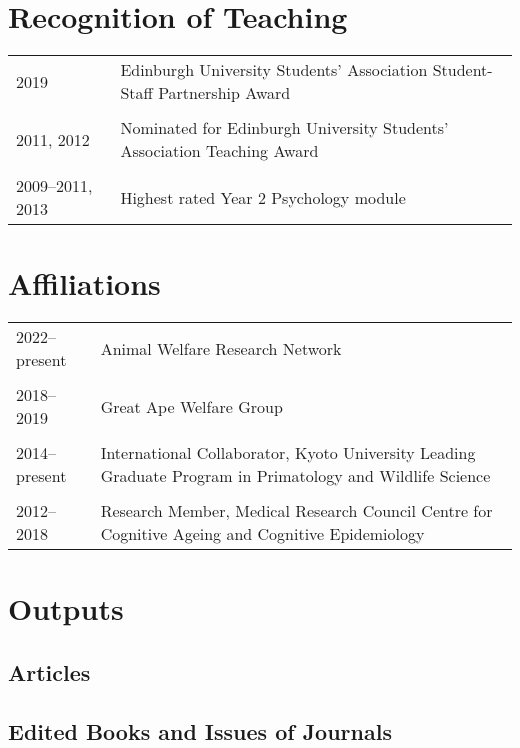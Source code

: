 \documentclass[11pt]{article}
\begin{document}
\section*{Recognition of Teaching}
\begin{tabular}{p{3cm}p{12cm}}
2019 & Edinburgh University Students' Association Student-Staff
Partnership Award \\ \\

2011, 2012 & Nominated for Edinburgh University Students' Association
Teaching Award \\ \\

2009--2011, 2013 & Highest rated Year 2 Psychology module 
\end{tabular}

\section*{Affiliations}

\begin{tabular}{p{3cm}p{12cm}}
2022--present & Animal Welfare Research Network \\ \\

2018--2019 & Great Ape Welfare Group \\ \\

2014--present & International Collaborator, Kyoto University Leading Graduate Program in
Primatology and Wildlife Science \\ \\

2012--2018 & Research Member, Medical Research Council Centre for
Cognitive Ageing and Cognitive Epidemiology
\end{tabular}

\section*{Outputs}
\subsection*{Articles}

\nocite{*}

\setlength\bibhang{0pt}

\printbibliography[type=article,notkeyword=reviewrevision,heading=none]

\subsection*{Edited Books and Issues of Journals}
\end{document}
